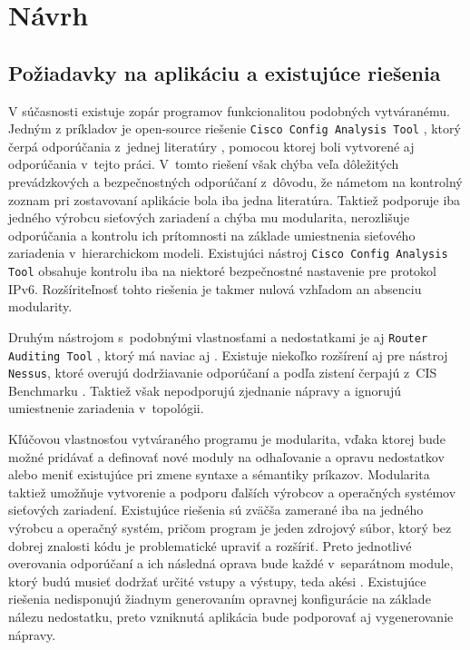 \chapter{Návrh}

\section{Požiadavky na aplikáciu a existujúce riešenia}
V súčasnosti existuje zopár programov funkcionalitou podobných vytváranému. Jedným z príkladov je open-source riešenie \texttt{Cisco Config Analysis Tool} \cite{AU81CvNW4q8RGnqM}, ktorý čerpá odporúčania z~jednej literatúry \cite{Singh2018}, pomocou ktorej boli vytvorené aj odporúčania v~tejto práci. V~tomto riešení však chýba veľa dôležitých prevádzkových a bezpečnostných odporúčaní z~dôvodu, že námetom na kontrolný zoznam pri zostavovaní aplikácie bola iba jedna literatúra. Taktiež podporuje iba jedného výrobcu sieťových zariadení a chýba mu modularita, nerozlišuje odporúčania a kontrolu ich prítomnosti na základe umiestnenia sieťového zariadenia v~hierarchickom modeli. Existujúci nástroj \texttt{Cisco Config Analysis Tool} obsahuje kontrolu iba na niektoré bezpečnostné nastavenie pre protokol IPv6. Rozšíriteľnosť tohto riešenia je takmer nulová vzhľadom an absenciu modularity.

\vspace{1em}
\noindent
Druhým nástrojom s~podobnými vlastnosťami a nedostatkami je aj \texttt{Router Auditing Tool} \cite{OniomAfGpef53LHq}, ktorý má naviac aj . Existuje niekoľko rozšírení aj pre nástroj \texttt{Nessus}, ktoré overujú dodržiavanie odporúčaní a podľa zistení čerpajú z~CIS Benchmarku \cite{CIS_DrTLsgXv24lxeIIM}. Taktiež však nepodporujú zjednanie nápravy a ignorujú umiestnenie zariadenia v~topológii.

\vspace{1em}
\noindent
Kľúčovou vlastnosťou vytváraného programu je modularita, vďaka ktorej bude možné pridávať a definovať nové moduly na odhaľovanie a opravu nedostatkov alebo meniť existujúce pri zmene syntaxe a sémantiky príkazov. Modularita taktiež umožňuje vytvorenie a podporu ďalších výrobcov a operačných systémov sieťových zariadení. Existujúce riešenia sú zväčša zamerané iba na jedného výrobcu a operačný systém, pričom program je jeden zdrojový súbor, ktorý bez dobrej znalosti kódu je problematické upraviť a rozšíriť. Preto jednotlivé overovania odporúčaní a ich následná oprava bude každé v~separátnom module, ktorý budú musieť dodržať určité vstupy a výstupy, teda akési . Existujúce riešenia nedisponujú žiadnym generovaním opravnej konfigurácie na základe nálezu nedostatku, preto vzniknutá aplikácia bude podporovať aj vygenerovanie nápravy.

